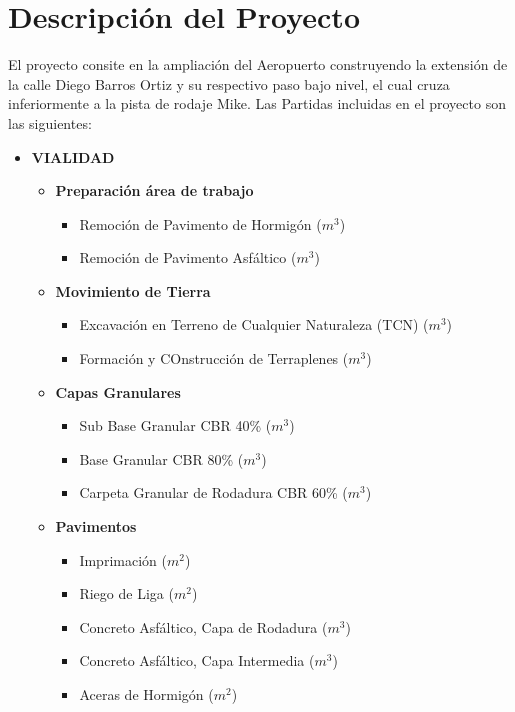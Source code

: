 \section{Descripción del Proyecto}

El proyecto consite en la ampliación del Aeropuerto construyendo 
la extensión de la calle Diego Barros Ortiz y su respectivo paso 
bajo nivel, el cual cruza inferiormente a la pista de rodaje Mike.
Las Partidas incluidas en el proyecto son las siguientes:

\begin{itemize}
    \item \textbf{VIALIDAD}
    \begin{itemize}
        \item \textbf{Preparación área de trabajo}
        \begin{itemize}
            \item Remoción de Pavimento de Hormigón ($m^3$)
            \item Remoción de Pavimento Asfáltico ($m^3$)
        \end{itemize}
        \item \textbf{Movimiento de Tierra}
        \begin{itemize}
            \item Excavación en Terreno de Cualquier Naturaleza (TCN) ($m^3$) 
            \item Formación y COnstrucción de Terraplenes ($m^3$)
        \end{itemize}
        \item \textbf{Capas Granulares}
        \begin{itemize}
            \item Sub Base Granular CBR 40\% ($m^3$)
            \item Base Granular CBR 80\% ($m^3$)
            \item Carpeta Granular de Rodadura CBR 60\% ($m^3$)
        \end{itemize}
        \item \textbf{Pavimentos}
        \begin{itemize}
            \item Imprimación ($m^2$)
            \item Riego de Liga ($m^2$)
            \item Concreto Asfáltico, Capa de Rodadura ($m^3$)
            \item Concreto Asfáltico, Capa Intermedia ($m^3$)
            \item Aceras de Hormigón ($m^2$)

\end{itemize}
\end{itemize}
\end{itemize}

